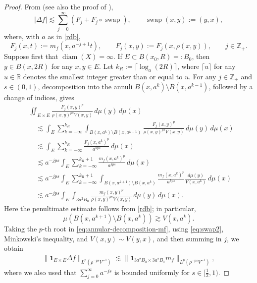 \documentclass[11pt]{amsart}
\theoremstyle{definition}
\theoremstyle{remark}
\numberwithin{equation}{section}
\newcommand{\Norm}[2]{\|#1\|_{#2}}
\begin{document}
\begin{proof}
From \cite[Lemma 2.2]{DLYYZ} (see also the proof of
\cite[Lemma 2.1]{DLYYZ}),
\begin{equation}\label{eq:swap2}
 |\Delta f|\lesssim\sum_{j=0}^\infty
 (F_j+F_j\circ\operatorname{swap}),
 \qquad \operatorname{swap}(x,y):=(y,x),
\end{equation}
where, with $a$ as in \eqref{rdb},
\begin{equation*}
 F_j(x,t):=m_f(x,a^{-j+1}t),\qquad
 F_j(x,y):=F_j(x,\rho(x,y)),\qquad j\in\mathbb Z_+.
\end{equation*}
Suppose first that $\operatorname{diam}(X)=\infty$.  If
$E\subset B(x_0,R)=:B_0$, then $y\in B(x,2R)$ for any $x,y\in E$.
Let $k_R:=\lceil\log_a(2R)\rceil$,
where $\lceil u\rceil$ for any $u\in\mathbb R$
denotes the smallest integer greater than or equal to $u$.
For any $j\in\mathbb Z_+$ and
$s\in(0,1)$, decomposition into the annuli
$B(x,a^k)\setminus B(x,a^{k-1})$, followed by a change of indices, gives
\begin{equation}\label{eq:annular-decomposition-mf}
\begin{aligned}
&\iint_{E\times E}\frac{F_j(x,y)^p}{\rho(x,y)^{ps}V(x,y)}
 \,d\mu(y)\,d\mu(x)\\
&\quad\lesssim
 \int_E\sum_{k=-\infty}^{k_R}
 \int_{B(x,a^k)\setminus B(x,a^{k-1})}
 \frac{F_j(x,y)^p}{\rho(x,y)^{ps}V(x,y)}
 \,d\mu(y)\,d\mu(x)\\
&\quad\lesssim
 \int_E\sum_{k=-\infty}^{k_R}
 \frac{F_j(x,a^k)^p}{a^{kps}}\,d\mu(x)\\
&\quad\lesssim
 a^{-jps}\int_E\sum_{k=-\infty}^{k_R+1}
 \frac{m_f(x,a^k)^p}{a^{kps}}\,d\mu(x)\\
&\quad\lesssim
 a^{-jps}\int_E\sum_{k=-\infty}^{k_R+1}
 \int_{B(x,a^{k+1})\setminus B(x,a^k)}
 \frac{m_f(x,a^k)^p}{a^{kps}}
 \frac{d\mu(y)}{V(x,a^k)}\,d\mu(x)\\
&\quad\lesssim
 a^{-jps}\int_E\int_{3a^2B_0}
 \frac{m_f(x,y)^p}{\rho(x,y)^{ps}V(x,y)}
 \,d\mu(y)\,d\mu(x).
\end{aligned}
\end{equation}
Here the penultimate estimate follows from \eqref{rdb}; in particular,
\begin{equation*}
 \mu(B(x,a^{k+1})\setminus B(x,a^k))
 \gtrsim V(x,a^k).
\end{equation*}
Taking the $p$-th root in \eqref{eq:annular-decomposition-mf}, using
\eqref{eq:swap2}, Minkowski's inequality, and $V(x,y)\sim V(y,x)$,
and then summing in $j$, we obtain
\begin{align}\label{eq:s3}
 \Norm{\mathbf{1}_{E\times E}\Delta f}{L^p(\rho^{-ps}V^{-1})}
 \lesssim
 \Norm{\mathbf{1}_{3a^2B_0\times3a^2B_0}m_f}
 {L^p(\rho^{-ps}V^{-1})},
\end{align}
where we also used that $\sum_{j=0}^\infty a^{-js}$ is bounded uniformly
for $s\in[\frac{1}{2},1)$.


\end{proof}
\end{document}

